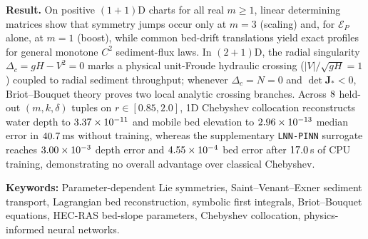 \documentclass[12pt,a4paper,oneside]{report}
\numberwithin{equation}{chapter}
\theoremstyle{definition}
\theoremstyle{remark}\newtheorem{remark}[theorem]{Remark}
\begin{document}
\medskip\noindent\textbf{Result.} On positive $(1+1)$D charts for all real $m\ge1$, linear determining matrices show that symmetry jumps occur only at $m=3$ (scaling) and, for $\mathcal E_P$ alone, at $m=1$ (boost), while common bed-drift translations yield exact profiles for general monotone $C^2$ sediment-flux laws. In $(2+1)$D, the radial singularity $\Delta_c=gH-V^2=0$ marks a physical unit-Froude hydraulic crossing ($|V|/\sqrt{gH}=1$) coupled to radial sediment throughput; whenever $\Delta_c=N=0$ and $\det\mathbf J_*<0$, Briot--Bouquet theory proves two local analytic crossing branches. Across $8$ held-out $(m,k,\delta)$ tuples on $r\in[0.85,2.0]$, 1D Chebyshev collocation reconstructs water depth to $3.37\times 10^{-11}$ and mobile bed elevation to $2.96\times 10^{-13}$ median error in $40.7$\,ms without training, whereas the supplementary \texttt{LNN-PINN} surrogate reaches $3.00\times 10^{-3}$ depth error and $4.55\times 10^{-4}$ bed error after $17.0$\,s of CPU training, demonstrating no overall advantage over classical Chebyshev.

\bigskip
\noindent\textbf{Keywords:} Parameter-dependent Lie symmetries, Saint--Venant--Exner sediment transport, Lagrangian bed reconstruction, symbolic first integrals, Briot--Bouquet equations, HEC-RAS bed-slope parameters, Chebyshev collocation, physics-informed neural networks.

\clearpage
\tableofcontents
\clearpage
{}
\listoffigures
\clearpage
{}
\listoftables
\clearpage
\end{document}
